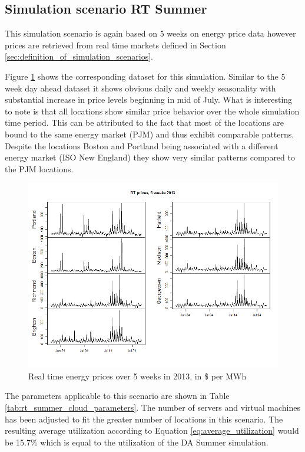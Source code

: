 \subsection{Simulation scenario RT Summer} \label{ssec:simulation_scenario_rt_summer}

This simulation scenario is again based on 5 weeks on energy price data however prices are retrieved from real time markets defined in Section \ref{sec:definition_of_simulation_scenarios}. 


Figure \ref{fig:rt_sim_2013_5weeks} shows the corresponding dataset for this simulation. Similar to the 5 week day ahead dataset it shows obvious daily and weekly seasonality with substantial increase in price levels beginning in mid of July. What is interesting to note is that all locations show similar price behavior over the whole simulation time period. This can be attributed to the fact that most of the locations are bound to the same energy market (PJM) and thus exhibit comparable patterns. Despite the locations Boston and Portland being associated with a different energy market (ISO New England) they show very similar patterns compared to the PJM locations. 

\begin{figure}[htbp]
	\centering
		\includegraphics[width=1.00\textwidth]{figures/evaluation_and_results/rt_sim_2013_5weeks.png}
	\caption{Real time energy prices over 5 weeks in 2013, in \$ per MWh}
	\label{fig:rt_sim_2013_5weeks}
\end{figure}

The parameters applicable to this scenario are shown in Table \ref{tab:rt_summer_cloud_parameters}. The number of servers and virtual machines has been adjusted to fit the greater number of locations in this scenario. The resulting average utilization according to Equation \ref{eq:average_utilization} would be 15.7\% which is equal to the utilization of the DA Summer simulation. 

